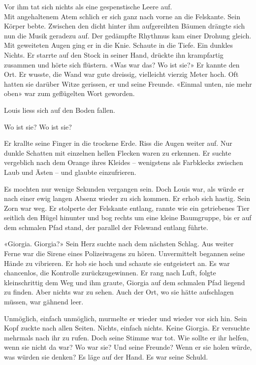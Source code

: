 Vor ihm tat sich nichts als eine gespenstische Leere auf.\\

Mit angehaltenem Atem schlich er sich ganz nach vorne an die Felskante. Sein Körper bebte. Zwischen den dicht hinter ihm
aufgereihten Bäumen drängte sich nun die Musik geradezu auf. Der
gedämpfte Rhythmus kam einer Drohung gleich. Mit geweiteten Augen ging
er in die Knie. Schaute in die Tiefe. Ein dunkles Nichts.
Er starrte auf den Stock in seiner Hand, drückte ihn krampfartig
zusammen und hörte sich flüstern.
«Was war das? Wo ist sie?»
Er kannte den Ort. Er wusste, die Wand war gute dreissig, vielleicht
vierzig Meter hoch. Oft hatten sie darüber Witze gerissen, er und seine
Freunde. «Einmal unten, nie mehr oben» war zum geflügelten Wort
geworden.

Louis liess sich auf den Boden fallen.

Wo ist sie? Wo ist sie?

Er krallte seine Finger in die trockene Erde. Riss die Augen weiter auf.
Nur dunkle Schatten mit einzelnen hellen Flecken waren zu
erkennen. Er suchte vergeblich nach dem Orange ihres Kleides – wenigstens als Farbklecks zwischen Laub und Ästen – und glaubte einzufrieren.

\sectionbreak

Es mochten nur wenige Sekunden vergangen sein. Doch Louis war, als würde er
nach einer ewig langen Absenz wieder zu sich kommen. 
Er erhob sich hastig. Sein Zorn war weg. 
Er stolperte der Felskante entlang, rannte wie ein getriebenes Tier
seitlich den Hügel hinunter und bog rechts um eine kleine Baumgruppe, 
bis er auf dem schmalen Pfad stand, der parallel der Felswand entlang
führte.

«Giorgia. Giorgia?»
Sein Herz suchte nach dem nächsten Schlag. Aus weiter Ferne war die
Sirene eines Polizeiwagens zu hören. Unvermittelt begannen seine Hände
zu vibrieren. Er hob sie hoch und schaute sie entgeistert an. Es war
chancenlos, die Kontrolle zurückzugewinnen. Er rang nach Luft, folgte kleinschrittig dem Weg und ihm graute, Giorgia auf dem schmalen Pfad liegend zu finden. Aber nichts war zu sehen. 
Auch der Ort, wo sie hätte aufschlagen müssen, war gähnend leer.

Unmöglich, einfach unmöglich, murmelte er wieder und wieder vor sich hin. Sein Kopf zuckte
nach allen Seiten. Nichts, einfach nichts. Keine Giorgia. Er versuchte mehrmals nach ihr zu rufen. Doch seine Stimme war tot.
Wie sollte er ihr helfen, wenn sie nicht da war? Wo war sie?
Und seine Freunde? Wenn er sie holen würde, was würden sie denken? Es
läge auf der Hand. Es war seine Schuld.

